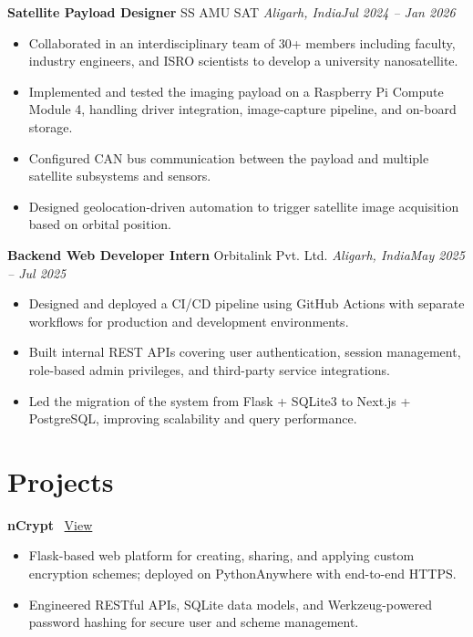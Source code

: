 \documentclass[10pt,letterpaper]{article}
\newcommand{\sep}{\,\textbullet\,}
\newcommand{\entry}[4]{%
  \textbf{#1}\sep #2\sep \textit{#3}\hfill\textit{#4}\par}
\begin{document}
\entry{Satellite Payload Designer}{SS AMU SAT}{Aligarh, India}{Jul 2024 -- Jan 2026}
\begin{itemize}
  \item Collaborated in an interdisciplinary team of 30+ members including faculty, industry engineers, and ISRO scientists to develop a university nanosatellite.
  \item Implemented and tested the imaging payload on a Raspberry Pi Compute Module 4, handling driver integration, image-capture pipeline, and on-board storage.
  \item Configured CAN bus communication between the payload and multiple satellite subsystems and sensors.
  \item Designed geolocation-driven automation to trigger satellite image acquisition based on orbital position.
\end{itemize}

\entry{Backend Web Developer Intern}{Orbitalink Pvt. Ltd.}{Aligarh, India}{May 2025 -- Jul 2025}
\begin{itemize}
  \item Designed and deployed a CI/CD pipeline using GitHub Actions with separate workflows for production and development environments.
  \item Built internal REST APIs covering user authentication, session management, role-based admin privileges, and third-party service integrations.
  \item Led the migration of the system from Flask + SQLite3 to Next.js + PostgreSQL, improving scalability and query performance.
\end{itemize}

\section*{Projects}

\textbf{nCrypt} \ \href{https://saadatahmad.pythonanywhere.com}{\small View}
\begin{itemize}
  \item Flask-based web platform for creating, sharing, and applying custom encryption schemes; deployed on PythonAnywhere with end-to-end HTTPS.
  \item Engineered RESTful APIs, SQLite data models, and Werkzeug-powered password hashing for secure user and scheme management.
\end{itemize}
\vspace{3pt}
\end{document}
